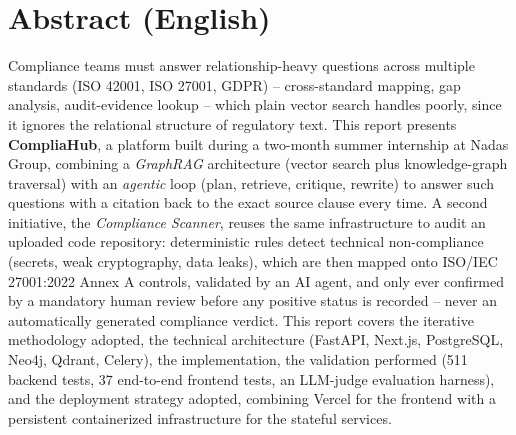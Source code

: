 \documentclass[12pt,a4paper]{report}
\begin{document}
\section*{Abstract (English)}
Compliance teams must answer relationship-heavy questions across multiple
standards (ISO 42001, ISO 27001, GDPR) -- cross-standard mapping, gap
analysis, audit-evidence lookup -- which plain vector search handles poorly,
since it ignores the relational structure of regulatory text. This report
presents \textbf{CompliaHub}, a platform built during a two-month summer
internship at Nadas Group, combining a \emph{GraphRAG} architecture (vector
search plus knowledge-graph traversal) with an \emph{agentic} loop (plan,
retrieve, critique, rewrite) to answer such questions with a citation back to
the exact source clause every time. A second initiative, the
\emph{Compliance Scanner}, reuses the same infrastructure to audit an
uploaded code repository: deterministic rules detect technical
non-compliance (secrets, weak cryptography, data leaks), which are then
mapped onto ISO/IEC 27001:2022 Annex A controls, validated by an AI agent,
and only ever confirmed by a mandatory human review before any positive
status is recorded -- never an automatically generated compliance verdict.
This report covers the iterative methodology adopted, the technical
architecture (FastAPI, Next.js, PostgreSQL, Neo4j, Qdrant, Celery), the
implementation, the validation performed (511 backend tests, 37 end-to-end
frontend tests, an LLM-judge evaluation harness), and the deployment
strategy adopted, combining Vercel for the frontend with a persistent
containerized infrastructure for the stateful services.

\clearpage


\tableofcontents
\clearpage

\listoffigures
{}
\clearpage

\listoftables
{}
\clearpage
\end{document}
